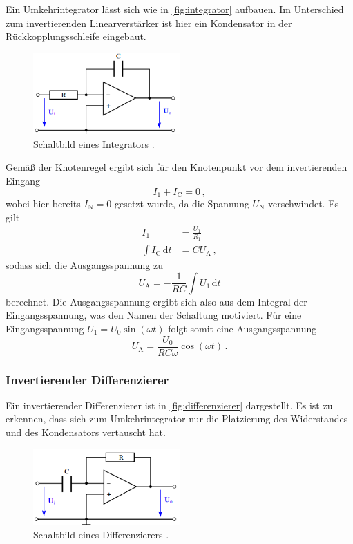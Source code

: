 \noindent
Ein Umkehrintegrator lässt sich wie in \autoref{fig:integrator} aufbauen. Im Unterschied zum invertierenden Linearverstärker ist hier ein Kondensator in der Rückkopplungsschleife eingebaut.


\begin{figure}
    \centering
    \includegraphics[width=0.5\textwidth]{integrator.png}
    \caption{Schaltbild eines Integrators \cite{ap51}.}
    \label{fig:integrator}
\end{figure}

\noindent
Gemäß der Knotenregel ergibt sich für den Knotenpunkt vor dem invertierenden Eingang 
\begin{equation*}
    I_1 + I_\text{C} = 0\, ,
\end{equation*}
wobei hier bereits $I_\text{N} = 0$ gesetzt wurde, da die Spannung $U_\text{N}$ verschwindet. Es gilt 
\begin{align*}
    I_1 &= \frac{U_1}{R_1} \\ 
    \int I_\text{C} \, \text{d}t &= C U_\text{A}\, ,
\end{align*}
sodass sich die Ausgangsspannung zu 
\begin{equation*}
    U_\text{A} = - \frac{1}{RC} \int U_1 \, \text{d}t
\end{equation*}
berechnet. Die Ausgangsspannung ergibt sich also aus dem Integral der Eingangsspannung, was den Namen der Schaltung motiviert. Für eine Eingangsspannung $U_1 = U_0 \sin(\omega t)$ folgt somit eine Ausgangsspannung 
\begin{equation}
    U_\text{A} = \frac{U_0}{RC\omega} \cos(\omega t)\, .
    \label{eqn:int}
\end{equation}

\subsubsection{Invertierender Differenzierer}

\noindent
Ein invertierender Differenzierer ist in \autoref{fig:differenzierer} dargestellt. Es ist zu erkennen, dass sich zum Umkehrintegrator nur die Platzierung des Widerstandes und des Kondensators vertauscht hat.
\begin{figure}
    \centering
    \includegraphics[width=0.5\textwidth]{differenzierer.png}
    \caption{Schaltbild eines Differenzierers \cite{ap51}.}
    \label{fig:differenzierer}
\end{figure}

